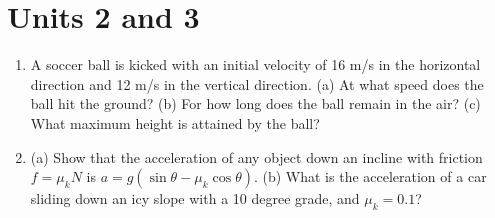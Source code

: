 \documentclass{article}
\begin{document}
\section{Units 2 and 3}

\begin{enumerate}
\item A soccer ball is kicked with an initial velocity of 16 m/s in the horizontal direction and 12 m/s in the vertical direction. (a) At what speed does the ball hit the ground? (b) For how long does the ball remain in the air? (c) What maximum height is attained by the ball? \\ \vspace{3cm}
\item (a) Show that the acceleration of any object down an incline with friction $f = \mu_k N$ is $a = g(\sin\theta - \mu_k \cos\theta)$. (b) What is the acceleration of a car sliding down an icy slope with a 10 degree grade, and $\mu_k = 0.1$? 
\end{enumerate}
\end{document}
